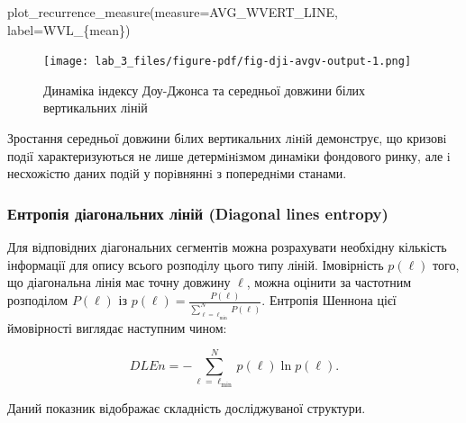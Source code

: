 \documentclass[
  letterpaper,
]{report}
\newenvironment{Shaded}{\begin{snugshade}}{\end{snugshade}}
\newcommand{\NormalTok}[1]{\textcolor[rgb]{0.00,0.23,0.31}{#1}}
\newcommand{\OperatorTok}[1]{\textcolor[rgb]{0.37,0.37,0.37}{#1}}
\newcommand{\SpecialCharTok}[1]{\textcolor[rgb]{0.37,0.37,0.37}{#1}}
\newcommand{\StringTok}[1]{\textcolor[rgb]{0.13,0.47,0.30}{#1}}
\begin{document}
\begin{Shaded}
\begin{Highlighting}[]
\NormalTok{plot\_recurrence\_measure(measure}\OperatorTok{=}\NormalTok{AVG\_WVERT\_LINE, label}\OperatorTok{=}\StringTok{\textquotesingle{}WVL\_}\SpecialCharTok{\{mean\}}\StringTok{\textquotesingle{}}\NormalTok{)}
\end{Highlighting}
\end{Shaded}

\begin{figure}[H]

{\centering \texttt{[image: lab\_3\_files/figure-pdf/fig-dji-avgv-output-1.png]}

}

\caption{\label{fig-dji-avgv}Динаміка індексу Доу-Джонса та середньої
довжини білих вертикальних ліній}

\end{figure}

Зростання середньої довжини бiлих вертикальних лiнiй демонструє, що
кризовi подiї характеризуються не лише детермiнiзмом динамiки фондового
ринку, але i несхожiстю даних подiй у порiвняннi з попереднiми станами.

\hypertarget{ux435ux43dux442ux440ux43eux43fux456ux44f-ux434ux456ux430ux433ux43eux43dux430ux43bux44cux43dux438ux445-ux43bux456ux43dux456ux439-diagonal-lines-entropy}{%
\subsubsection{Ентропія діагональних ліній (Diagonal lines
entropy)}\label{ux435ux43dux442ux440ux43eux43fux456ux44f-ux434ux456ux430ux433ux43eux43dux430ux43bux44cux43dux438ux445-ux43bux456ux43dux456ux439-diagonal-lines-entropy}}

Для відповідних діагональних сегментів можна розрахувати необхідну
кількість інформації для опису всього розподілу цього типу ліній.
Імовірність \(p(\ell )\) того, що діагональна лінія має точну довжину
\(\ell\), можна оцінити за частотним розподілом \(P(\ell )\) із
\(p( \ell )={\frac {P(\ell )}{\sum _{{\ell = \ell_{\min }}}^{N}P(\ell )}}\).
Ентропія Шеннона цієї ймовірності виглядає наступним чином:

\[
DLEn = -\sum_{{\ell =\ell _{\min }}}^{N}p(\ell )\ln p(\ell ). 
\]

Даний показник відображає складність досліджуваної структури.
\end{document}
